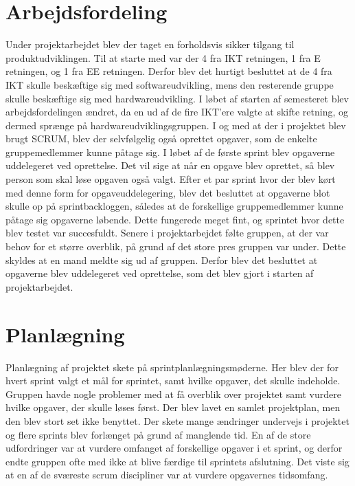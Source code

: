  \section{Arbejdsfordeling}
Under projektarbejdet blev der taget en forholdsvis sikker tilgang til produktudviklingen. Til at starte med var der 4 fra IKT retningen, 1 fra E retningen, og 
1 fra EE retningen. Derfor blev det hurtigt besluttet at de 4 fra IKT skulle beskæftige sig med softwareudvikling, mens den resterende gruppe skulle beskæftige 
sig med hardwareudvikling. I løbet af starten af semesteret blev arbejdsfordelingen ændret, da en ud af de fire IKT’ere valgte at skifte retning, og dermed 
sprænge på hardwareudviklingsgruppen. 
I og med at der i projektet blev brugt SCRUM, blev der selvfølgelig også oprettet opgaver, som de enkelte gruppemedlemmer kunne påtage sig. I løbet af de første 
sprint blev opgaverne uddelegeret ved oprettelse. Det vil sige at når en opgave blev oprettet, så blev person som skal løse opgaven også valgt. Efter et par 
sprint hvor der blev kørt med denne form for opgaveuddelegering, blev det besluttet at opgaverne blot skulle op på sprintbackloggen, således at de forskellige 
gruppemedlemmer kunne påtage sig opgaverne løbende. Dette fungerede meget fint, og sprintet hvor dette blev testet var succesfuldt. Senere i projektarbejdet 
følte gruppen, at der var behov for et større overblik, på grund af det store pres gruppen var under. Dette skyldes at en mand meldte sig ud af gruppen. Derfor 
blev det besluttet at opgaverne blev uddelegeret ved oprettelse, som det blev gjort i starten af projektarbejdet.


\section{Planlægning}
Planlægning af projektet skete på sprintplanlægningsmøderne. Her blev der for hvert sprint valgt et mål for sprintet, samt hvilke opgaver, det skulle indeholde.
Gruppen havde nogle problemer med at få overblik over projektet samt vurdere hvilke opgaver, der skulle løses først. Der blev lavet en samlet projektplan,
men den blev stort set ikke benyttet.
Der skete mange ændringer undervejs i projektet og flere sprints blev forlænget på grund af manglende tid. En af de store udfordringer var at vurdere omfanget
af forskellige opgaver i et sprint, og derfor endte gruppen ofte med ikke at blive færdige til sprintets afslutning. Det viste sig at en af de sværeste
scrum discipliner var at vurdere opgavernes tidsomfang. 

